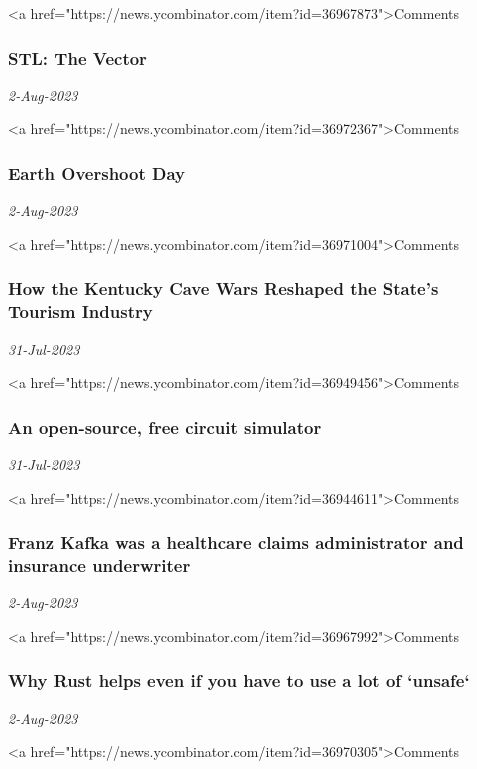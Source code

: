 <a href="https://news.ycombinator.com/item?id=36967873">Comments
\subsubsection{STL: The Vector \href{https://devblogs.microsoft.com/oldnewthing/20230802-00/?p=108524}{}}
\textit{2-Aug-2023}

<a href="https://news.ycombinator.com/item?id=36972367">Comments
\subsubsection{Earth Overshoot Day \href{https://www.overshootday.org/about/}{}}
\textit{2-Aug-2023}

<a href="https://news.ycombinator.com/item?id=36971004">Comments
\subsubsection{How the Kentucky Cave Wars Reshaped the State’s Tourism Industry \href{https://www.smithsonianmag.com/history/how-the-kentucky-cave-wars-reshaped-the-states-tourism-industry-180982585/}{}}
\textit{31-Jul-2023}

<a href="https://news.ycombinator.com/item?id=36949456">Comments
\subsubsection{An open-source, free circuit simulator \href{https://hackaday.com/2023/07/30/an-open-source-free-circuit-simulator/}{}}
\textit{31-Jul-2023}

<a href="https://news.ycombinator.com/item?id=36944611">Comments
\subsubsection{Franz Kafka was a healthcare claims administrator and insurance underwriter \href{https://vienna.earth/plate/russell/kafka-insurance-career}{}}
\textit{2-Aug-2023}

<a href="https://news.ycombinator.com/item?id=36967992">Comments
\subsubsection{Why Rust helps even if you have to use a lot of `unsafe` \href{https://v5.chriskrycho.com/journal/unsafe/}{}}
\textit{2-Aug-2023}

<a href="https://news.ycombinator.com/item?id=36970305">Comments
